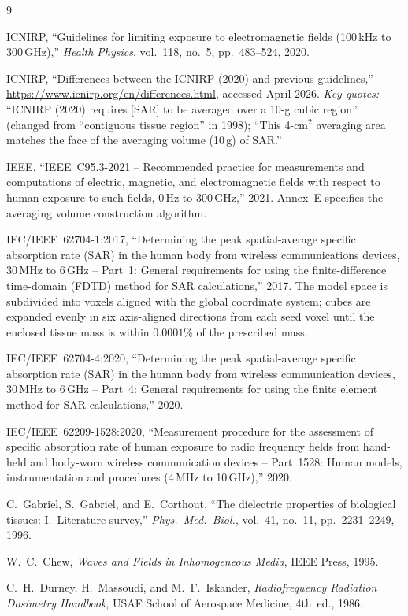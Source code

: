 \documentclass[11pt,a4paper]{article}
\theoremstyle{definition}
\theoremstyle{remark}
\begin{document}

\begin{thebibliography}{9}

ICNIRP,
``Guidelines for limiting exposure to electromagnetic fields
(100\,kHz to 300\,GHz),''
\emph{Health Physics}, vol.~118, no.~5, pp.~483--524, 2020.

ICNIRP,
``Differences between the ICNIRP (2020) and previous guidelines,''
\url{https://www.icnirp.org/en/differences.html}, accessed April 2026.
%
\emph{Key quotes:}
``ICNIRP (2020) requires [SAR] to be averaged over a 10-g cubic region''
(changed from ``contiguous tissue region'' in 1998);
``This 4-cm$^2$ averaging area matches the face of the averaging volume
(10\,g) of SAR.''

IEEE,
``IEEE~C95.3-2021 -- Recommended practice for measurements and computations
of electric, magnetic, and electromagnetic fields with respect to human
exposure to such fields, 0\,Hz to 300\,GHz,'' 2021.
%
Annex~E specifies the averaging volume construction algorithm.

IEC/IEEE~62704-1:2017,
``Determining the peak spatial-average specific absorption rate (SAR) in the
human body from wireless communications devices, 30\,MHz to 6\,GHz --
Part~1: General requirements for using the finite-difference time-domain
(FDTD) method for SAR calculations,'' 2017.
%
The model space is subdivided into voxels aligned with the global coordinate
system; cubes are expanded evenly in six axis-aligned directions from each
seed voxel until the enclosed tissue mass is within $0.0001$\% of the
prescribed mass.

IEC/IEEE~62704-4:2020,
``Determining the peak spatial-average specific absorption rate (SAR) in the
human body from wireless communication devices, 30\,MHz to 6\,GHz --
Part~4: General requirements for using the finite element method for SAR
calculations,'' 2020.

IEC/IEEE~62209-1528:2020,
``Measurement procedure for the assessment of specific absorption rate of
human exposure to radio frequency fields from hand-held and body-worn
wireless communication devices -- Part~1528: Human models, instrumentation
and procedures (4\,MHz to 10\,GHz),'' 2020.

C.~Gabriel, S.~Gabriel, and E.~Corthout,
``The dielectric properties of biological tissues: I.~Literature survey,''
\emph{Phys.\ Med.\ Biol.}, vol.~41, no.~11, pp.~2231--2249, 1996.

W.~C.~Chew,
\emph{Waves and Fields in Inhomogeneous Media},
IEEE Press, 1995.

C.~H.~Durney, H.~Massoudi, and M.~F.~Iskander,
\emph{Radiofrequency Radiation Dosimetry Handbook},
USAF School of Aerospace Medicine, 4th~ed., 1986.

\end{thebibliography}
\end{document}
